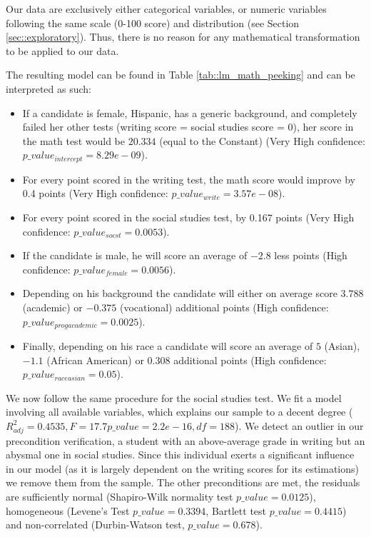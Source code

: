 \documentclass[10pt, a4paper]{article}
\begin{document}
	Our data are exclusively either categorical variables, or numeric variables following the same scale (0-100 score) and distribution (see Section \ref{sec::exploratory}). Thus, there is no reason for any mathematical transformation to be applied to our data.
	
	
	
	The resulting model can be found in Table \ref{tab::lm_math_peeking} and can be interpreted as such: 
	\begin{itemize}
		\item If a candidate is female, Hispanic, has a generic background, and completely failed her other tests (writing score = social studies score = 0), her score in the math test would be $20.334$ (equal to the Constant) (Very High confidence: $p\_value_{intercept} = 8.29e-09$). 
		\item For every point scored in the writing test, the math score would improve by 0.4 points (Very High confidence: $p\_value_{write} = 3.57e-08$).
		\item For every point scored in the social studies test, by 0.167 points (Very High confidence: $p\_value_{socst} = 0.0053$).
		\item If the candidate is male, he will score an average of $-2.8$ less points (High confidence: $p\_value_{female} = 0.0056$).
		\item Depending on his background the candidate will either on average score $3.788$ (academic) or $-0.375$ (vocational) additional points (High confidence: $p\_value_{progacademic} = 0.0025$).
		\item Finally, depending on his race a candidate will score an average of $5$ (Asian), $-1.1$ (African American) or $0.308$ additional points (High confidence: $p\_value_{raceasian} = 0.05$).
	\end{itemize}

	We now follow the same procedure for the social studies test. We fit a model involving all available variables, which explains our sample to a decent degree ($R^2_{adj} = 0.4535, F= 17.7 p\_value=2.2e-16, df=188$). We detect an outlier in our precondition verification, a student with an above-average grade in writing but an abysmal one in social studies. Since this individual exerts a significant influence in our model (as it is largely dependent on the writing scores for its estimations) we remove them from the sample. The other preconditions are met, the residuals are sufficiently normal (Shapiro-Wilk normality test $p\_value = 0.0125$), homogeneous (Levene's Test $p\_value = 0.3394$, Bartlett test $p\_value = 0.4415$) and non-correlated (Durbin-Watson test, $p\_value=0.678$).
	
\end{document}
